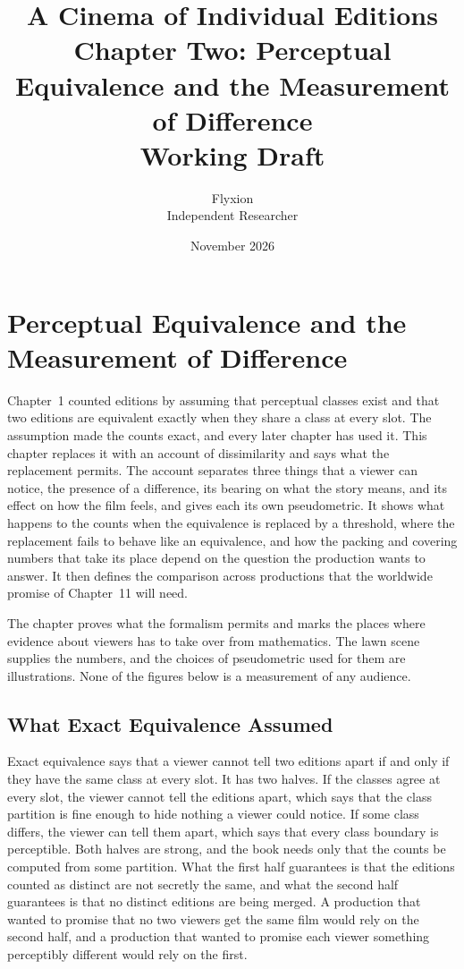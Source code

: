 \documentclass[11pt,twoside,openright]{book}
\title{\Huge\bfseries A Cinema of Individual Editions\\[1.2ex]
\large Chapter Two: Perceptual Equivalence and the Measurement of Difference\\[0.4ex]
\large Working Draft}
\author{Flyxion\\[0.3ex]\small Independent Researcher}
\date{November 2026}
\theoremstyle{plain}
\theoremstyle{definition}
\theoremstyle{remark}
\begin{document}
\frontmatter
\maketitle
\tableofcontents
\mainmatter
\setcounter{chapter}{1}

\chapter{Perceptual Equivalence and the Measurement of Difference}
\label{ch:perceptual}

Chapter~1 counted editions by assuming that perceptual classes exist and that two editions are equivalent exactly when they share a class at every slot. The assumption made the counts exact, and every later chapter has used it. This chapter replaces it with an account of dissimilarity and says what the replacement permits. The account separates three things that a viewer can notice, the presence of a difference, its bearing on what the story means, and its effect on how the film feels, and gives each its own pseudometric. It shows what happens to the counts when the equivalence is replaced by a threshold, where the replacement fails to behave like an equivalence, and how the packing and covering numbers that take its place depend on the question the production wants to answer. It then defines the comparison across productions that the worldwide promise of Chapter~11 will need.

The chapter proves what the formalism permits and marks the places where evidence about viewers has to take over from mathematics. The lawn scene supplies the numbers, and the choices of pseudometric used for them are illustrations. None of the figures below is a measurement of any audience.

\section{What Exact Equivalence Assumed}\label{sec:assumed}

Exact equivalence says that a viewer cannot tell two editions apart if and only if they have the same class at every slot. It has two halves. If the classes agree at every slot, the viewer cannot tell the editions apart, which says that the class partition is fine enough to hide nothing a viewer could notice. If some class differs, the viewer can tell them apart, which says that every class boundary is perceptible. Both halves are strong, and the book needs only that the counts be computed from some partition. What the first half guarantees is that the editions counted as distinct are not secretly the same, and what the second half guarantees is that no distinct editions are being merged. A production that wanted to promise that no two viewers get the same film would rely on the second half, and a production that wanted to promise each viewer something perceptibly different would rely on the first.
\end{document}
